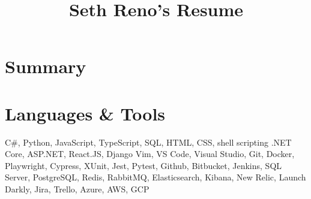 \documentclass[11pt,letterpaper,final]{moderncv}
\title{Seth Reno's Resume}
\begin{document}
\maketitle
\section{Summary}

\section{Languages \& Tools} 
{C\#, Python, JavaScript, TypeScript, SQL, HTML, CSS, shell scripting}
{.NET Core, ASP.NET, React.JS, Django}
{Vim, VS Code, Visual Studio, Git, Docker,
Playwright, Cypress,
XUnit, Jest, Pytest,
Github, Bitbucket, Jenkins,
SQL Server, PostgreSQL, Redis, RabbitMQ, Elasticsearch,
Kibana, New Relic, Launch Darkly,
Jira, Trello,
Azure, AWS, GCP
}
\end{document}
